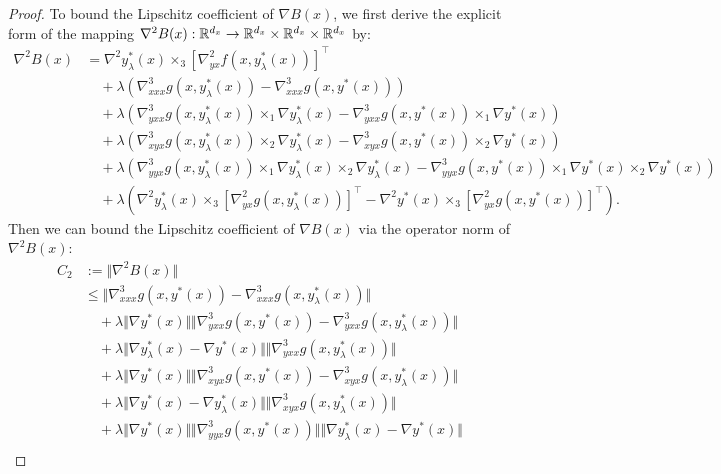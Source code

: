 \begin{proof}
To bound the Lipschitz coefficient of $\nabla B(x)$,
we first derive the explicit form of the mapping $\nabla^2 B(x): {\mathbb{R}}^{d_x} \rightarrow {\mathbb{R}}^{d_x} \times {\mathbb{R}}^{d_x} \times {\mathbb{R}}^{d_x} $ by:
\begin{align*}
    \nabla^2 B(x) 
    &= 
    \nabla^2 y_{\lambda}^*(x) \times_3 [\nabla_{yx}^2 f(x,y_{\lambda}^*(x))]^\top \\
    &\quad + \lambda ( \nabla_{xxx}^3 g(x,y_{\lambda}^*(x)) - \nabla_{xxx}^3 g(x,y^*(x)) ) \\
    &\quad + \lambda ( 
    \nabla_{yxx}^3 g(x,y_{\lambda}^*(x)) \times_1 \nabla y_{\lambda}^*(x) - \nabla_{yxx}^3 g(x,y^*(x)) \times_1 \nabla y^*(x) 
    ) \\
    &\quad + \lambda \left(  \nabla_{xyx}^3 g(x,y_{\lambda}^*(x)) \times_2 \nabla y_{\lambda}^*(x) - \nabla_{xyx}^3 g(x,y^*(x))   \times_2 \nabla y^*(x) \right)  \\
    &\quad + \lambda \left( 
     \nabla_{yyx}^3 g(x,y_{\lambda}^*(x)) \times_1 \nabla y_{\lambda}^*(x) \times_2  \nabla y_{\lambda}^*(x)   - 
    \nabla_{yyx}^3 g(x,y^*(x)) \times_1 \nabla y^*(x)  \times_2 \nabla y^*(x)
    \right) \\
    &\quad + \lambda \left(  \nabla^2 y_{\lambda}^*(x) \times_3 [\nabla_{yx}^2 g(x,y_{\lambda}^*(x))]^\top -  \nabla^2 y^*(x) \times_3 [\nabla_{yx}^2 g(x,y^*(x))]^\top\right).
\end{align*}
Then we can bound the Lipschitz coefficient of $\nabla B(x)$
via the operator norm of $\nabla^2 B(x)$:  
\begin{align*}
   C_2&:= \Vert \nabla^2 B(x) \Vert \\
    &\le 
    \Vert \nabla_{xxx}^3 g(x,y^*(x)) - 
    \nabla_{xxx}^3 g(x,y_{\lambda}^*(x))\Vert  \\
    &\quad + \lambda \Vert \nabla y^*(x) \Vert \Vert \nabla_{yxx}^3 g(x,y^*(x)) - \nabla_{yxx}^3 g(x,y_{\lambda}^*(x)) \Vert \\
    &\quad+ \lambda \Vert \nabla y_{\lambda}^*(x) - \nabla y^*(x) \Vert \Vert \nabla_{yxx}^3 g(x,y_{\lambda}^*(x)) \Vert \\
    &\quad + \lambda \Vert \nabla y^*(x) \Vert \Vert \nabla_{xyx}^3 g(x,y^*(x)) - \nabla_{xyx}^3 g(x,y_{\lambda}^*(x)) \Vert  \\
    &\quad + \lambda \Vert \nabla y^*(x) - \nabla y_{\lambda}^*(x) \Vert \Vert \nabla_{xyx}^3 g(x,y_{\lambda}^*(x)) \Vert \\
    &\quad + \lambda \Vert \nabla y^*(x) \Vert \Vert \nabla_{yyx}^3 g(x,y^*(x)) \Vert  \Vert \nabla y_{\lambda}^*(x) - \nabla y^*(x) \Vert  \\

\end{align*}
\end{proof}
